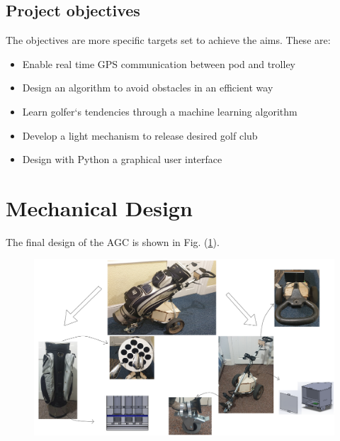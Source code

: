 \documentclass[11pt,landscape]{article}
\begin{document}
\begin{multicols}{3}
\subsection{Project objectives}
The objectives are more specific targets set to achieve the aims. These are:
\begin{itemize}
    \item	Enable real time GPS communication between pod and trolley
    \item	Design an algorithm to avoid obstacles in an efficient way
    \item	Learn golfer`s tendencies through a machine learning algorithm
    \item	Develop a light mechanism to release desired golf club
    \item	Design with Python a graphical user interface
\end{itemize}

\newpage
\end{multicols}
\section{Mechanical Design}
The final design of the AGC is shown in Fig. (\ref{fig:complete_design}).
\begin{figure}[H]
    \begin{center}
        \includegraphics[width=\textwidth]{Complete Design.PNG}
        \label{fig:complete_design}
    \end{center}
\end{figure}
\end{document}
